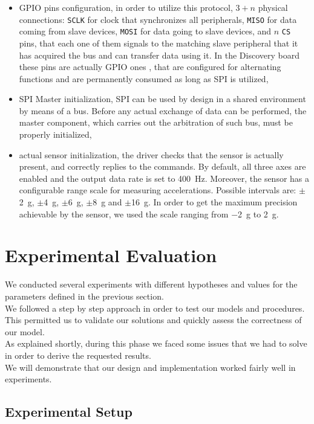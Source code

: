 \begin{itemize}
	\item GPIO pins configuration, in order to utilize this protocol, $3 + n$ physical connections: \texttt{SCLK} for clock that synchronizes all peripherals, \texttt{MISO} for data coming from slave devices, \texttt{MOSI} for data going to slave devices, and $n$ \texttt{CS} pins, that each one of them signals to the matching slave peripheral that it has acquired the bus and can transfer data using it. In the Discovery board these pins are actually GPIO ones \cite{STM32F4RefMan}, that are configured for alternating functions and are permanently consumed as long as SPI is utilized,
	\item SPI Master initialization, SPI can be used by design in a shared environment by means of a bus. Before any actual exchange of data can be performed, the master component, which carries out the arbitration of such bus, must be properly initialized,
	\item actual sensor initialization, the driver checks that the sensor is actually present, and correctly replies to the commands. By default, all three axes are enabled and the output data rate is set to \SI{400}{\Hz}. Moreover, the sensor has a configurable range scale for measuring accelerations. Possible intervals are: $\pm$\SI{2}{\g}, $\pm$\SI{4}{\g}, $\pm$\SI{6}{\g}, $\pm$\SI{8}{\g} and $\pm$\SI{16}{\g}. In order to get the maximum precision achievable by the sensor, we used the scale ranging from \SI{-2}{\g} to \SI{+2}{\g}.
\end{itemize}
\pagebreak

\section{Experimental Evaluation}
We conducted several experiments with different hypotheses and values for the parameters defined in the previous section. \\
We followed a step by step approach in order to test our models and procedures. This permitted us to validate our solutions and quickly assess the correctness of our model. \\
As explained shortly, during this phase we faced some issues that we had to solve in order to derive the requested results. \\
We will demonstrate that our design and implementation worked fairly well in experiments.
\subsection{Experimental Setup}
